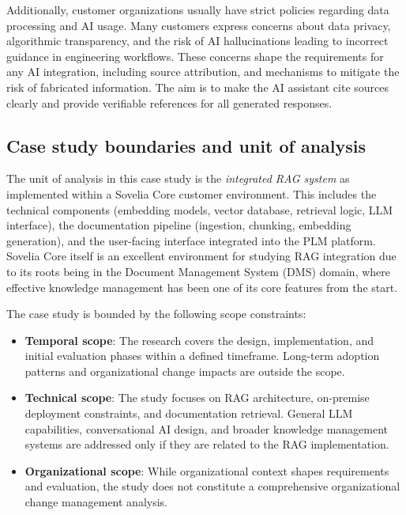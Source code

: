 Additionally, customer organizations usually have strict policies regarding data processing and AI usage. Many customers express concerns about data privacy, algorithmic transparency, and the risk of AI hallucinations leading to incorrect guidance in engineering workflows. These concerns shape the requirements for any AI integration, including source attribution, and mechanisms to mitigate the risk of fabricated information. The aim is to make the AI assistant cite sources clearly and provide verifiable references for all generated responses.

\subsection{Case study boundaries and unit of analysis}
\label{subsec:case-boundaries}

The unit of analysis in this case study is the \emph{integrated RAG system} as implemented within a Sovelia Core customer environment. This includes the technical components (embedding models, vector database, retrieval logic, LLM interface), the documentation pipeline (ingestion, chunking, embedding generation), and the user-facing interface integrated into the PLM platform. Sovelia Core itself is an excellent environment for studying RAG integration due to its roots being in the Document Management System (DMS) domain, where effective knowledge management has been one of its core features from the start.

The case study is bounded by the following scope constraints:

\begin{itemize}
    \item \textbf{Temporal scope}: The research covers the design, implementation, and initial evaluation phases within a defined timeframe. Long-term adoption patterns and organizational change impacts are outside the scope.
    \item \textbf{Technical scope}: The study focuses on RAG architecture, on-premise deployment constraints, and documentation retrieval. General LLM capabilities, conversational AI design, and broader knowledge management systems are addressed only if they are related to the RAG implementation.
    \item \textbf{Organizational scope}: While organizational context shapes requirements and evaluation, the study does not constitute a comprehensive organizational change management analysis.
\end{itemize}

